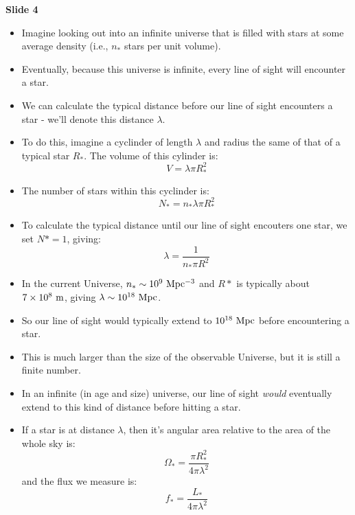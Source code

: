 \documentclass[11pt]{article}
\begin{document}
\noindent
{\bf Slide 4}
\begin{itemize}
  \item Imagine looking out into an infinite universe that is filled with stars at some average density (i.e., $n_\ast$ stars per unit volume).
  \item Eventually, because this universe is infinite, every line of sight will encounter a star.
  \item We can calculate the typical distance before our line of sight encounters a star - we'll denote this distance $\lambda$.
  \item To do this, imagine a cyclinder of length $\lambda$ and radius the same of that of a typical star $R_\ast$. The volume of this cylinder is:
  \begin{equation}
    V = \lambda\pi R_\ast^2
  \end{equation}
  \item The number of stars within this cyclinder is:
  \begin{equation}
    N_\ast = n_\ast\lambda\pi R_\ast^2
  \end{equation}
  \item To calculate the typical distance until our line of sight encouters one star, we set $N\ast=1$, giving:
  \begin{equation}
  \lambda = \frac{1}{n_\ast\pi R^2}
  \end{equation}
  \item In the current Universe, $n_\ast\sim10^9~{\rm Mpc^{-3}}$ and $R\ast$ is typically about $7\times10^8~{\rm m}$, giving $\lambda\sim10^{18}~{\rm Mpc}$.
  \item So our line of sight would typically extend to $10^{18}~{\rm Mpc}$ before encountering a star.
  \item This is much larger than the size of the observable Universe, but it is still a finite number.
  \item In an infinite (in age and size) universe, our line of sight {\it would} eventually extend to this kind of distance before hitting a star.
  \item If a star is at distance $\lambda$, then it's angular area relative to the area of the whole sky is:
  \begin{equation}
    \Omega_\ast = \frac{\pi R_\ast^2}{4\pi \lambda^2}
  \end{equation}
  and the flux we measure is:
  \begin{equation}
    f_\ast = \frac{L_\ast}{4\pi \lambda^2}
  \end{equation}

\end{itemize}
\end{document}
